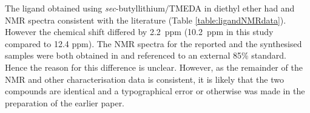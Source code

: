 The \tBuxantphos{} ligand obtained using \emph{sec}-butyllithium$/$TMEDA in diethyl ether had \proton{} and \carbon{} NMR spectra consistent with the literature (Table \ref{table:ligandNMRdata}).\cite{Mispelaere2005} However the \phosphorus{} chemical shift differed by 2.2~ppm (10.2~ppm in this study compared to 12.4 ppm).  The NMR spectra for the reported and the synthesised samples were both obtained in  and referenced to an external 85\%  standard.  Hence the reason for this difference is unclear.  However, as the remainder of the NMR and other characterisation data is consistent, it is likely that the two compounds are identical and a typographical error or otherwise was made in the preparation of the earlier paper.






